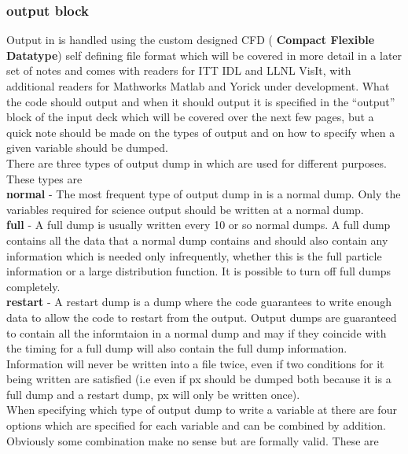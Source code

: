 \documentclass[12pt,a4paper]{article}
\newcommand{\emphtext}{\color{warwickdark} \fontfamily{phv}\selectfont\Large\bf}
\newcommand{\inlineemph}[1]{{\color{warwicklight} \bf{#1}}}
\newcommand{\EPOCH}{{\color{warwickdark}\fontfamily{phv}\selectfont{EPOCH}}}
\begin{document}
\subsubsection{\inlineemph{output} block}
Output in {\EPOCH} is handled using the custom designed CFD (\inlineemph{Compact
Flexible Datatype}) self defining file format which will be covered in more
detail in a later set of notes and comes with readers for ITT IDL and LLNL
VisIt, with additional readers for Mathworks Matlab and Yorick under
development. What the code should output and when it should output it is
specified in the ``output'' block of the input deck which will be covered over
the next few pages, but a quick note should be made on the types of output and
on how to specify when a given variable should be dumped.\\

There are three types of output dump in {\EPOCH} which are used for different
purposes. These types are\\

{\emphtext normal} - The most frequent type of output dump in {\EPOCH} is a
normal dump. Only the variables required for science output should be written
at a normal dump.\\

{\emphtext full} - A full dump is usually written every 10 or so normal
dumps. A full dump contains all the data that a normal dump contains and should
also contain any information which is needed only infrequently, whether this is
the full particle information or a large distribution function. It is possible
to turn off full dumps completely.\\

{\emphtext restart} - A restart dump is a dump where the code guarantees to
write enough data to allow the code to restart from the output. Output dumps
are guaranteed to contain all the informtaion in a normal dump and may if they
coincide with the timing for a full dump will also contain the full dump
information.\\

Information will never be written into a file twice, even if two conditions for
it being written are satisfied (i.e even if px should be dumped both because it
is a full dump and a restart dump, px will only be written once).\\

When specifying which type of output dump to write a variable at there are four
options which are specified for each variable and can be combined by
addition. Obviously some combination make no sense but are formally
valid. These are\\
\end{document}
